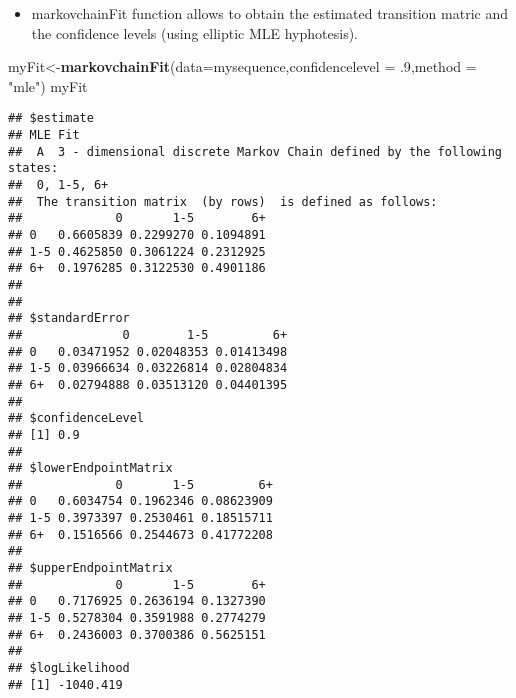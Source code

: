 \documentclass[ignorenonframetext,]{beamer}
\newenvironment{Shaded}{\begin{snugshade}}{\end{snugshade}}
\newcommand{\DataTypeTok}[1]{\textcolor[rgb]{0.13,0.29,0.53}{#1}}
\newcommand{\FloatTok}[1]{\textcolor[rgb]{0.00,0.00,0.81}{#1}}
\newcommand{\KeywordTok}[1]{\textcolor[rgb]{0.13,0.29,0.53}{\textbf{#1}}}
\newcommand{\NormalTok}[1]{#1}
\newcommand{\StringTok}[1]{\textcolor[rgb]{0.31,0.60,0.02}{#1}}
\providecommand{\tightlist}{%
  \setlength{\itemsep}{0pt}\setlength{\parskip}{0pt}}
\providecommand{\tightlist}{
  \setlength{\itemsep}{0pt}\setlength{\parskip}{0pt}
}
\begin{document}
\begin{frame}[fragile]

\begin{itemize}
\tightlist
\item
  markovchainFit function allows to obtain the estimated transition
  matric and the confidence levels (using elliptic MLE hyphotesis).
\end{itemize}

\begin{Shaded}
\begin{Highlighting}[]
\NormalTok{myFit<-}\KeywordTok{markovchainFit}\NormalTok{(}\DataTypeTok{data=}\NormalTok{mysequence,}\DataTypeTok{confidencelevel =} \FloatTok{.9}\NormalTok{,}\DataTypeTok{method =} \StringTok{"mle"}\NormalTok{)}
\NormalTok{myFit}
\end{Highlighting}
\end{Shaded}

\begin{verbatim}
## $estimate
## MLE Fit 
##  A  3 - dimensional discrete Markov Chain defined by the following states: 
##  0, 1-5, 6+ 
##  The transition matrix  (by rows)  is defined as follows: 
##             0       1-5        6+
## 0   0.6605839 0.2299270 0.1094891
## 1-5 0.4625850 0.3061224 0.2312925
## 6+  0.1976285 0.3122530 0.4901186
## 
## 
## $standardError
##              0        1-5         6+
## 0   0.03471952 0.02048353 0.01413498
## 1-5 0.03966634 0.03226814 0.02804834
## 6+  0.02794888 0.03513120 0.04401395
## 
## $confidenceLevel
## [1] 0.9
## 
## $lowerEndpointMatrix
##             0       1-5         6+
## 0   0.6034754 0.1962346 0.08623909
## 1-5 0.3973397 0.2530461 0.18515711
## 6+  0.1516566 0.2544673 0.41772208
## 
## $upperEndpointMatrix
##             0       1-5        6+
## 0   0.7176925 0.2636194 0.1327390
## 1-5 0.5278304 0.3591988 0.2774279
## 6+  0.2436003 0.3700386 0.5625151
## 
## $logLikelihood
## [1] -1040.419
\end{verbatim}

\end{frame}
\end{document}
